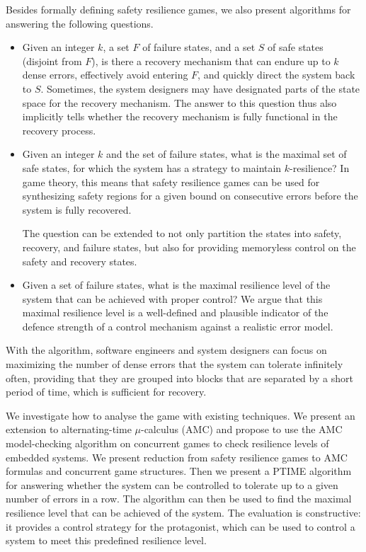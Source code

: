 Besides formally defining safety resilience games, we also present algorithms for answering the following questions.  
\begin{itemize} 
\item Given an integer $k$, a set $F$ of failure states, and 
  a set $S$ of safe states (disjoint from $F$), is there a recovery mechanism that 
  can endure up to $k$ dense errors, 
  effectively avoid entering $F$, and quickly direct the system back to $S$.  
  Sometimes, the system designers may have designated parts of the state space 
  for the recovery mechanism.  
  The answer to this question thus also implicitly tells 
  whether the recovery 
  mechanism is fully functional in the recovery process. 
\item Given an integer $k$ and the set of failure states, 
  what is the maximal set of safe states, 
  for which the system has a strategy to maintain $k$-resilience?
  In game theory, this means that 
  safety resilience games can be used for synthesizing safety regions 
  for a given bound on consecutive errors before the system is fully recovered.  
  
The question can be extended to not only partition the states into safety, recovery, and failure states, but also for providing memoryless control on the safety and recovery states.
  
\item Given a set of failure states, what is the maximal resilience level of the system that can be achieved with proper control?  
  We argue that this maximal resilience level is a well-defined and plausible indicator of the defence strength of a control mechanism against a realistic error model. 
\end{itemize} 
With the algorithm, software engineers and system designers can focus on maximizing the number of dense errors that the system can tolerate infinitely often, providing that they are grouped into blocks that are separated by a short period of time, which is sufficient for recovery.

We investigate how to analyse the game with existing techniques. 
We present an extension to alternating-time $\mu$-calculus (AMC) and propose to use the AMC model-checking algorithm on concurrent games to check resilience levels of embedded systems. 
We present reduction from safety resilience games to AMC formulas and concurrent game structures.  
Then we present a PTIME algorithm for answering whether the system can be controlled to tolerate up to a given number of errors in a row.
The algorithm can then be used to find the maximal resilience level that can be achieved of the system. 
The evaluation is constructive: it provides a control strategy for the protagonist, which can be used to control a system to meet this predefined resilience level.


  



